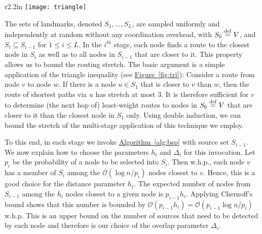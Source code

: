 \documentclass[letterpaper,11pt]{article}
\newcommand{\namedref}[2]{\hyperref[#2]{#1~\ref*{#2}}}
\newcommand{\figref}[1]{\namedref{Figure}{#1}}
\newcommand{\algref}[1]{\namedref{Algorithm}{#1}}
\newcommand{\BO}{\mathcal{O}}
\newcommand{\DEF}{\ensuremath{\stackrel{\rm def}{=}}}
\begin{document}
\begin{wrapfigure}{r}{2.2in}
\centering
\texttt{[image: triangle]}
\caption{\small The distance from $v$ to $w$ is at least one third
of the length of the route from $v$ to $w$ via $u$.}
\label{fig:tri}
\end{wrapfigure}
The sets of landmarks, denoted $S_1,\ldots,S_L$, are sampled uniformly
and independently 
at random without any coordination overhead, with $S_0\DEF V$, and 
$S_{i}\subseteq S_{i-1}$ for $1\le i\le L$.
In the $i^{th}$ stage, each node finds
a route to the closest node in $S_i$ as well as
to all nodes in $S_{i-1}$ that are closer to it.
This property allows us to bound the routing stretch. The basic argument is a simple
application of the triangle inequality (see \figref{fig:tri}): Consider a route  from node
$v$ to node $w$. If there is a node $u\in S_1$ that is closer to $v$ than
$w$, then the route of shortest paths via $u$ has stretch at most $3$.
It is therefore sufficient for $v$
to determine (the next hop of) least-weight routes to nodes in
$S_0\DEF V$ that are closer to it than the closest node in $S_1$
only. Using double induction, we can bound the stretch of the
multi-stage application of this technique we employ.

To this end, in each stage we invoke \algref{alg:bsp} with source set
$S_{i-1}$. We now explain how to choose the parameters $h_i$ and
$\Delta_i$ for this invocation. Let $p_i$ be the probability of 
a node to be selected into $S_i$. Then w.h.p., each node $v$ has a member of
$S_i$ among the $\BO(\log n/p_i)$ nodes closest to $v$. Hence, this is a good
choice for the distance parameter $h_i$. The expected number of nodes from
$S_{i-1}$ among the  $h_i$ nodes closest to a given node is $p_{i-1}h_i$.
Applying Chernoff's bound shows that this number is bounded by
$\BO(p_{i-1}h_i)=\BO(p_{i-1}\log n /p_i)$ w.h.p. This is an upper bound on
the number of sources that need to be detected by each node and therefore is our
choice of the overlap parameter $\Delta_i$.
\end{document}
